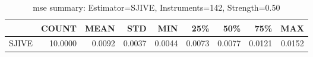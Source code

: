 \begin{table}[ht]
\centering
\caption{mse summary: Estimator=SJIVE, Instruments=142, Strength=0.50}
\begin{tabular}{lrrrrrrrr}
\toprule
 & COUNT & MEAN & STD & MIN & 25\% & 50\% & 75\% & MAX \\
\midrule
SJIVE & 10.0000 & 0.0092 & 0.0037 & 0.0044 & 0.0073 & 0.0077 & 0.0121 & 0.0152 \\
\bottomrule
\end{tabular}
\end{table}
